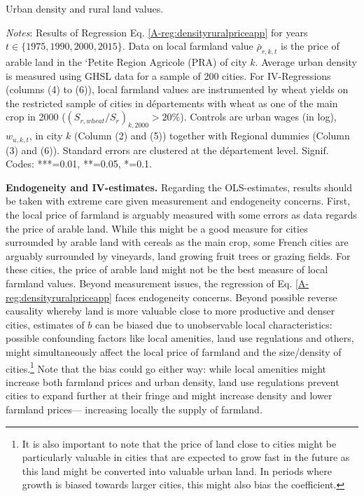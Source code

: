 \documentclass[11pt]{report}
\newcommand{\datatables}{../../output/data/tables}
\begin{document}
\begin{table}[h!]
	\begin{center}
		
		\caption{Urban density and rural land values.\label{A-tab:densityruralpriceAPP}}
	\end{center}
	{\footnotesize \textit{Notes}: Results of Regression Eq. \ref{A-reg:densityruralpriceapp} for years $t \in \{1975, 1990, 2000, 2015\}$. Data on local farmland value $\bar{\rho}_{r,k,t}$ is the price of arable land in the `Petite Region Agricole (PRA) of city $k$.  Average urban density is measured using GHSL data for a sample of 200 cities. For IV-Regressions (columns (4) to (6)), local farmland values are instrumented by wheat yields on the restricted sample of cities in départements with wheat as one of the main crop in 2000 ($(S_{r,wheat}/S_r)_{k,2000}>20\%$). Controls are urban wages (in log), $w_{u,k,t}$, in city $k$ (Column (2) and (5)) together with Regional dummies (Column (3) and (6)). Standard errors are clustered at the département level. Signif. Codes: ***=0.01, **=0.05, *=0.1.}
\end{table}



\noindent \textbf{Endogeneity and IV-estimates.} Regarding the OLS-estimates, results should be taken with extreme care given measurement and endogeneity concerns. First, the local price of farmland is arguably measured with some errors as data regards the price of arable land. While this might be a good measure for cities surrounded by arable land with cereals as the main crop, some French cities are arguably surrounded by vineyards, land growing fruit trees or grazing fields. For these cities, the price of arable land might not be the best measure of local farmland values. Beyond measurement issues, the regression of Eq. \ref{A-reg:densityruralpriceapp} faces endogeneity concerns. Beyond possible reverse causality whereby land is more valuable close to more productive and denser cities, estimates of $b$ can be biased due to unobservable local characteristics: possible confounding factors like local amenities, land use regulations and others, might simultaneously affect the local price of farmland and the size/density of cities.\footnote{It is also important to note that the price of land close to cities might be particularly valuable in cities that are expected to grow fast in the future as this land might be converted into valuable urban land. In periods where growth is biased towards larger cities, this might also bias the coefficient.} Note that the bias could go either way: while local amenities might increase both farmland prices and urban density, land use regulations prevent cities to expand further at their fringe and might increase density and lower farmland prices--- increasing locally the supply of farmland.  
\end{document}

